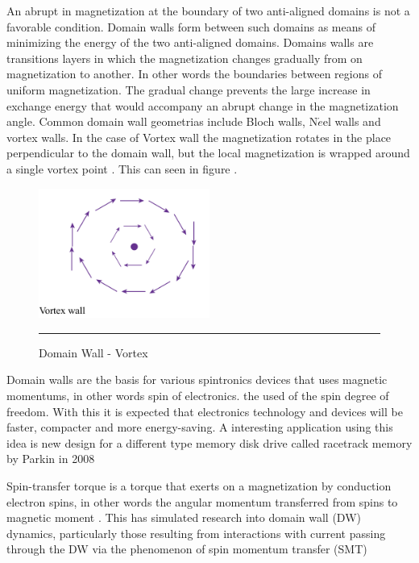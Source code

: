 An abrupt in magnetization at the boundary of two anti-aligned domains is not a favorable condition. Domain walls form between such domains as means of minimizing the energy of the two anti-aligned domains. Domains walls are transitions layers in which the magnetization changes gradually from on magnetization to another. In other words the boundaries between regions of uniform magnetization.  The gradual change prevents the large increase in exchange energy that would accompany an abrupt change in the magnetization angle. Common domain wall geometrias include Bloch walls, N$\acute{e}$el walls and vortex walls. In the case of Vortex wall the magnetization rotates in the place perpendicular to the domain wall, but the local magnetization is wrapped around a single vortex point \cite{spindomain}. This can seen in figure \label{eq:kg4}.

\begin{figure}[htbp]
	\centering
		\includegraphics[width=0.5\textwidth]{Figures/vortex.png}
		\rule{35em}{0.5pt}
	\caption[Domain Wall - Vortex]{Domain Wall - Vortex}
	\label{fig:vortex}
\end{figure}

Domain walls are the basis for various spintronics devices that uses magnetic momentums, in other words spin of electronics. the used of the spin degree of freedom. With this it is expected that electronics technology and devices will be faster, compacter and more energy-saving. A interesting application using this idea is new design for a different type memory disk drive called racetrack memory by Parkin in 2008\cite{racetrack}

Spin-transfer torque is a torque that exerts on a magnetization by conduction electron spins, in other words the angular momentum transferred from spins to magnetic  moment \cite{zhang}.
This has simulated research into domain wall (DW) dynamics, particularly those resulting from interactions with current passing through the DW via the phenomenon of spin momentum transfer (SMT) \cite{handbookspin}

